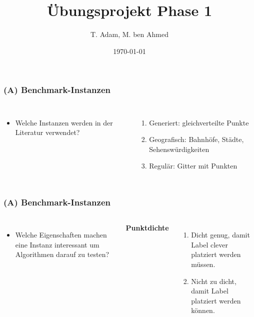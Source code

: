 \documentclass[aspectratio=169]{beamer}
\title[Übungsprojekt Phase 1]{Übungsprojekt Phase 1} %
\author{T. Adam, M. ben Ahmed} %
\institute[UOS] %
{

Universität Osnabrück \\ %

\medskip
\textit{Æ} %


}
\date{\today} %
\begin{document}
\begin{frame}
\titlepage %
\end{frame}





\begin{frame}
	\frametitle{(A) Benchmark-Instanzen}
	\begin{columns}[c] %
	
	\begin{itemize}
		\item Welche Instanzen werden in der Literatur verwendet? \pause
		
	\end{itemize}
	
	\begin{enumerate}
	\item Generiert: gleichverteilte Punkte\pause
	\item Geografisch: Bahnhöfe, Städte, Sehenswürdigkeiten\pause
	\item Regulär: Gitter mit Punkten
	\end{enumerate}
	

	\end{columns}
	\end{frame}

\begin{frame}
	\frametitle{(A) Benchmark-Instanzen}
	\begin{columns}[c] %
	
	\begin{itemize}
		\item Welche Eigenschaften machen eine Instanz interessant um Algorithmen darauf zu testen? \pause
	\end{itemize}
	
	\textbf{Punktdichte}
	\begin{enumerate}

	\item Dicht genug, damit Label clever platziert werden müssen. \pause
	\item Nicht zu dicht, damit Label platziert werden können. 
	\end{enumerate}
	

	\end{columns}
	\end{frame}
\end{document}
